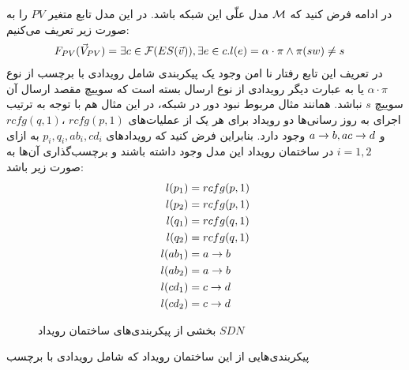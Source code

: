 در ادامه فرض کنید که 
$\mathcal{M}$
مدل علّی این شبکه باشد.
در این مدل تابع متغیر
$PV$
را به صورت زیر تعریف می‌کنیم:
\begin{align*}
    F_{PV}(\vec V_{PV}) & = \exists c \in \mathcal{F}(ES(\vec v)),
    \exists e \in c. l(e) =  \alpha\cdot\pi \wedge \pi(sw) \neq s
\end{align*}
در تعریف این تابع رفتار نا امن وجود یک پیکربندی شامل رویدادی با برچسب از نوع 
$\alpha \cdot \pi$
یا به عبارت دیگر رویدادی از نوع ارسال بسته است که سوییچ مقصد ارسال آن سوییچ 
$s$
نباشد.
همانند مثال مربوط نبود دور در شبکه، در این مثال هم با توجه به ترتیب اجرای به روز رسانی‌ها دو رویداد برای هر یک از عملیات‌های 
$rcfg(p,1)$
،$rcfg(q,1)$
و
$a\rightarrow b,a c\rightarrow d$
وجود دارد. 
بنابراین فرض کنید که رویدادهای
$p_i,q_i,ab_i,cd_i$
به ازای 
$i=1,2$
در ساختمان رویداد این مدل وجود داشته باشند و برچسب‌گذاری آن‌ها به صورت زیر باشد:
\begin{align*}
    l(p_1) & = rcfg(p,1) \\
    l(p_2) & = rcfg(p,1) \\
    l(q_1) & = rcfg(q,1) \\
    l(q_2) & = rcfg(q,1) \\
    l(ab_1) & = a \rightarrow b \\
    l(ab_2) & = a \rightarrow b \\
    l(cd_1) & = c \rightarrow d \\
    l(cd_2) & = c \rightarrow d \\
\end{align*}
\begin{figure}
    \centering
    \caption{
        بخشی از پیکربندی‌های ساختمان رویداد
        $SDN$
    }
    \label{fig:blackhole:es}
\end{figure}
پیکربندی‌هایی از این ساختمان رویداد که شامل رویدادی با برچسب 
